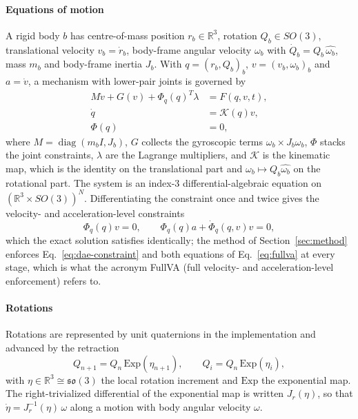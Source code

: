 \documentclass[preprint,12pt]{elsarticle}
\begin{document}
\paragraph{Equations of motion}
A rigid body $b$ has centre-of-mass position $r_b\in\mathbb R^3$, rotation $Q_b\in SO(3)$,
translational velocity $v_b=\dot r_b$, body-frame angular velocity $\omega_b$ with
$\dot Q_b=Q_b\,\widehat{\omega_b}$, mass $m_b$ and body-frame inertia $J_b$. With
$q=(r_b,Q_b)_b$, $v=(v_b,\omega_b)_b$ and $a=\dot v$, a mechanism with lower-pair joints is
governed by
\begin{align}
  M\dot v + G(v) + \Phi_q(q)^T\lambda &= F(q,v,t), \label{eq:dae-dyn}\\
  \dot q &= \mathcal K(q)v, \label{eq:dae-kin}\\
  \Phi(q) &= 0, \label{eq:dae-constraint}
\end{align}
where $M=\operatorname{diag}(m_bI,J_b)$, $G$ collects the gyroscopic terms
$\omega_b\times J_b\omega_b$, $\Phi$ stacks the joint constraints, $\lambda$ are the Lagrange
multipliers, and $\mathcal K$ is the kinematic map, which is the identity on the translational part
and $\omega_b\mapsto Q_b\widehat{\omega_b}$ on the rotational part. The system is an index-3
differential-algebraic equation on $(\mathbb R^3\times SO(3))^{N}$. Differentiating the constraint
once and twice gives the velocity- and acceleration-level constraints
\begin{equation}
  \Phi_q(q)v=0,\qquad \Phi_q(q)a+\dot\Phi_q(q,v)v=0,
  \label{eq:fullva}
\end{equation}
which the exact solution satisfies identically; the method of Section~\ref{sec:method} enforces
Eq.~\eqref{eq:dae-constraint} and both equations of Eq.~\eqref{eq:fullva} at every stage, which
is what the acronym FullVA (full velocity- and acceleration-level enforcement) refers to.

\paragraph{Rotations}
Rotations are represented by unit quaternions in the implementation and advanced by the retraction
\begin{equation}
  Q_{n+1}=Q_n\,\mathrm{Exp}(\eta_{n+1}),\qquad Q_i=Q_n\,\mathrm{Exp}(\eta_i),
  \label{eq:retraction}
\end{equation}
with $\eta\in\mathbb R^3\cong\mathfrak{so}(3)$ the local rotation increment and $\mathrm{Exp}$
the exponential map. The right-trivialized differential of the exponential map is written
$J_r(\eta)$, so that $\dot\eta=J_r^{-1}(\eta)\,\omega$ along a motion with body angular velocity
$\omega$.
\end{document}
